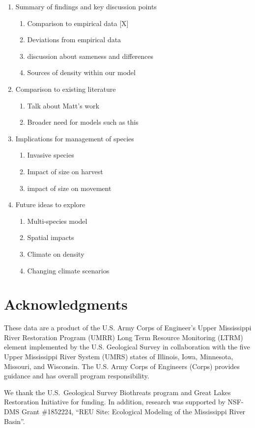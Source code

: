 \documentclass[preprint,review,12pt,authoryear]{elsarticle}
\begin{document}
\begin{enumerate}
\item Summary of findings and key discussion points
  \begin{enumerate}
  \item Comparison to empirical data [X]
  \item Deviations from empirical data
  \item discussion about sameness and differences 
  \item Sources of density within our model
  \end{enumerate}
\item Comparison to existing literature
  \begin{enumerate}
  \item Talk about Matt's work \citep{catalano2010size,
      catalano2011whole}
  \item Broader need for models such as this
  \end{enumerate}
\item Implications for management of species
  \begin{enumerate}
  \item Invasive species
  \item Impact of size on harvest
  \item impact of size on movement
  \end{enumerate}
\item Future ideas to explore
  \begin{enumerate}
  \item Multi-species model
  \item Spatial impacts
  \item Climate on density
  \item Changing climate scenarios
  \end{enumerate}
\end{enumerate}

\section{Acknowledgments}

These data are a product of the U.S. Army Corps of Engineer's Upper Mississippi 
River Restoration Program (UMRR) Long Term Resource Monitoring (LTRM) element 
implemented by the U.S. Geological Survey in collaboration with the five 
Upper Mississippi River System (UMRS) states of Illinois, Iowa, Minnesota, 
Missouri, and Wisconsin.
The U.S. Army Corps of Engineers (Corps) 
provides guidance and has overall program responsibility.

We thank the U.S.~Geological Survey  Biothreats program and Great
Lakes Restoration Initiative for funding.
In addition, research was supported by NSF-DMS Grant \#1852224, ``REU Site: Ecological Modeling of the Mississippi River Basin''. 


  
 
\end{document}
